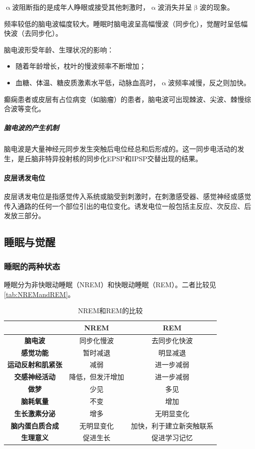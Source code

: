 $\upalpha$波阻断指的是成年人睁眼或接受其他刺激时，$\upalpha$波消失并呈$\upbeta$波的现象。

频率较低的脑电波幅度较大。睡眠时脑电波呈高幅慢波（同步化），觉醒时呈低幅快波（去同步化）。

脑电波形受年龄、生理状况的影响：
\begin{itemize}
	\item 随着年龄增长，枕叶的慢波频率不断增加；
	\item 血糖、体温、糖皮质激素水平低，动脉血高时，$\upalpha$波频率减慢，反之则加快。
\end{itemize}

癫痫患者或皮层有占位病变（如脑瘤）的患者，脑电波可出现棘波、尖波、棘慢综合波等变化。

\subparagraph{脑电波的产生机制}

脑电波是大量神经元同步发生突触后电位经总和后形成的。这一同步电活动的发生，是丘脑非特异投射核的同步化EPSP和IPSP交替出现的结果。

\paragraph{皮层诱发电位}

皮层诱发电位是指感觉传入系统或脑受到刺激时，在刺激感受器、感觉神经或感觉传入通路的任何一个部位引出的电位变化。诱发电位一般包括主反应、次反应、后发放三部分。

\subsection{睡眠与觉醒}

\subsubsection{睡眠的两种状态}

睡眠分为非快眼动睡眠（NREM）和快眼动睡眠（REM）。二者比较见\autoref{tab:NREMandREM}。

\begin{table}[htbp]
	\centering
	\begin{tabularx}{\textwidth}{|c|C|C|}
		\hline
		& \textbf{NREM} & \textbf{REM} \\ \hline
		\textbf{脑电波} & 同步化慢波 & 去同步化快波 \\ \hline
		\textbf{感觉功能} & 暂时减退 & 明显减退 \\ \hline
		\textbf{运动反射和肌紧张} & 减弱 & 进一步减弱 \\ \hline
		\textbf{交感神经活动} & 降低，但发汗增加 & 进一步减弱 \\ \hline
		\textbf{做梦} & 少见 & 多见 \\ \hline
		\textbf{脑耗氧量} & 不变 & 增加 \\ \hline
		\textbf{生长激素分泌} & 增多 & 无明显变化 \\ \hline
		\textbf{脑内蛋白质合成} & 无明显变化 & 加快，利于建立新突触联系 \\ \hline
		\textbf{生理意义} & 促进生长 & 促进学习记忆 \\ \hline
	\end{tabularx}
	\caption{NREM和REM的比较}
	\label{tab:NREMandREM}
\end{table}

